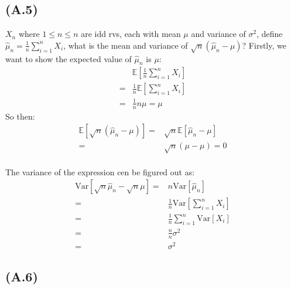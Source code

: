 \documentclass[]{article}
\begin{document}
    \subsection*{(A.5)}
        $X_n$ where $1 \le n \le n$ are idd rvs, each with mean $\mu$ and variance of $\sigma^2$, define $\hat{\mu}_n = \frac{1}{n}\sum_{i = 1}^n X_i$, what is the mean and variance of $\sqrt{n}(\hat{\mu}_n - \mu)$? 
        Firstly, we want to show the expected value of $\hat{\mu}_n$ is $\mu$: 
        \begin{align*}\tag{1.5.1}\label{eqn:1.5.1}
            &\mathbb{E}\left[
                \frac{1}{n} \sum_{i = 1}^{n} X_i
                \right]
            \\
            =& \frac{1}{n}\mathbb{E}\left[
                \sum_{i = 1}^{n}X_i
            \right]
            \\
            =&
            \frac{1}{n}n\mu = \mu
        \end{align*}
        So then: 
        \begin{align*}\tag{1.5.2}\label{eqn:1.5.2}
            \mathbb{E}\left[\sqrt{n}(\hat{\mu}_n - \mu)\right]
            =&
            \sqrt{n}\mathbb{E}\left[\hat{\mu}_n - \mu\right]
            \\
            =& \sqrt{n}(\mu - \mu) = 0
        \end{align*}
        \\
        The variance of the expression cen be figured out as: 
        \begin{align*}\tag{1.5.3}\label{eqn:1.5.3}
            \text{Var}\left[\sqrt{n}\hat{\mu}_n - \sqrt{n}\mu\right]
            =& n \text{Var}\left[\hat{\mu}_n\right]
            \\
            =&
            \frac{1}{n} \text{Var}\left[
                \sum_{i =1 }^{n}X_i
            \right] 
            \\
            =& \frac{1}{n}\sum_{i = 1}^{n}\text{Var}\left[X_i\right]
            \\
            =&  \frac{n}{n}\sigma^2
            \\
            =& \sigma^2
        \end{align*}
    \subsection*{(A.6)}
\end{document}
